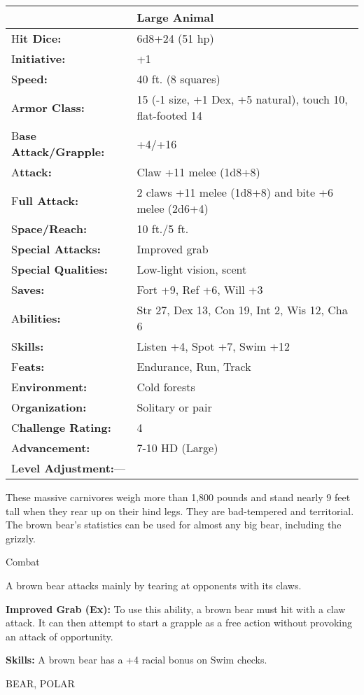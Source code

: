 \documentclass{article}
\begin{document}
\begin{tabular}{|>{\raggedright}p{91pt}|>{\raggedright}p{226pt}|}
\hline
  & Large Animal\tabularnewline
\hline
H\textbf{it Dice:} & 6d8+24 (51 hp)\tabularnewline
\hline
I\textbf{nitiative:} & +1\tabularnewline
\hline
S\textbf{peed:} & 40 ft. (8 squares)\tabularnewline
\hline
A\textbf{rmor Class:} & 15 (-1 size, +1 Dex, +5 natural), touch 10, flat-footed 
14\tabularnewline
\hline
B\textbf{ase Attack/Grapple:} & +4/+16\tabularnewline
\hline
A\textbf{ttack:} & Claw +11 melee (1d8+8)\tabularnewline
\hline
F\textbf{ull Attack:} & 2 claws +11 melee (1d8+8) and bite +6 melee (2d6+4)\tabularnewline
\hline
S\textbf{pace/Reach:} & 10 ft./5 ft.\tabularnewline
\hline
S\textbf{pecial Attacks:} & Improved grab\tabularnewline
\hline
S\textbf{pecial Qualities:} & Low-light vision, scent\tabularnewline
\hline
S\textbf{aves:} & Fort +9, Ref +6, Will +3\tabularnewline
\hline
A\textbf{bilities:} & Str 27, Dex 13, Con 19, Int 2, Wis 12, Cha 6\tabularnewline
\hline
S\textbf{kills:} & Listen +4, Spot +7, Swim +12\tabularnewline
\hline
F\textbf{eats:} & Endurance, Run, Track\tabularnewline
\hline
E\textbf{nvironment:} & Cold forests\tabularnewline
\hline
O\textbf{rganization:} & Solitary or pair\tabularnewline
\hline
C\textbf{hallenge Rating:} & 4\tabularnewline
\hline
A\textbf{dvancement:} & 7-10 HD (Large)\tabularnewline
\hline
L\textbf{evel Adjustment:}--- & \tabularnewline
\hline
\end{tabular}

These massive carnivores weigh more than 1,800 pounds and stand nearly 9 feet tall 
when they rear up on their hind legs. They are bad-tempered and territorial. The 
brown bear's statistics can be used for almost any big bear, including the grizzly. 

Combat

A brown bear attacks mainly by tearing at opponents with its claws.

\textbf{Improved Grab (Ex): }To use this ability, a brown bear must hit with a 
claw attack. It can then attempt to start a grapple as a free action without provoking 
an attack of opportunity.

\textbf{Skills:} A brown bear has a +4 racial bonus on Swim checks.

\vspace{12pt}
BEAR, POLAR
\end{document}
